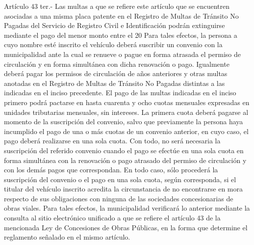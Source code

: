     Artículo 43 ter.- Las multas a que se refiere este artículo que se encuentren asociadas a una misma placa patente en el Registro de Multas de Tránsito No Pagadas del Servicio de Registro Civil e Identificación podrán extinguirse mediante el pago del menor monto entre el 20%
    Para tales efectos, la persona a cuyo nombre esté inscrito el vehículo deberá suscribir un convenio con la municipalidad ante la cual se renueve o pague en forma atrasada el permiso de circulación y en forma simultánea con dicha renovación o pago. Igualmente deberá pagar los permisos de circulación de años anteriores y otras multas anotadas en el Registro de Multas de Tránsito No Pagadas distintas a las indicadas en el inciso precedente. El pago de las multas indicadas en el inciso primero podrá pactarse en hasta cuarenta y ocho cuotas mensuales expresadas en unidades tributarias mensuales, sin intereses. La primera cuota deberá pagarse al momento de la suscripción del convenio, salvo que previamente la persona haya incumplido el pago de una o más cuotas de un convenio anterior, en cuyo caso, el pago deberá realizarse en una sola cuota. Con todo, no será necesaria la suscripción del referido convenio cuando el pago se efectúe en una sola cuota en forma simultánea con la renovación o pago atrasado del permiso de circulación y con los demás pagos que correspondan. En todo caso, sólo procederá la suscripción del convenio o el pago en una sola cuota, según corresponda, si el titular del vehículo inscrito acredita la circunstancia de no encontrarse en mora respecto de sus obligaciones con ninguna de las sociedades concesionarias de obras viales. Para tales efectos, la municipalidad verificará lo anterior mediante la consulta al sitio electrónico unificado a que se refiere el artículo 43 de la mencionada Ley de Concesiones de Obras Públicas, en la forma que determine el reglamento señalado en el mismo artículo.
